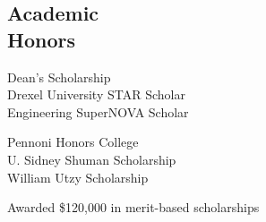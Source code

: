 \documentclass[margin]{res}
\begin{document}
\begin{resume}
\section{Academic \\ Honors}
\begin{minipage}[t]{0.5\linewidth}
Dean's Scholarship \\
Drexel University STAR Scholar \\
Engineering SuperNOVA Scholar \\
\end{minipage}
\begin{minipage}[t]{0.5\linewidth}
Pennoni Honors College \\
U. Sidney Shuman Scholarship \\
William Utzy Scholarship \\
\end{minipage}

\vspace{-5mm}
{\centering Awarded \$120,000 in merit-based scholarships

}


\end{resume}
\end{document}
